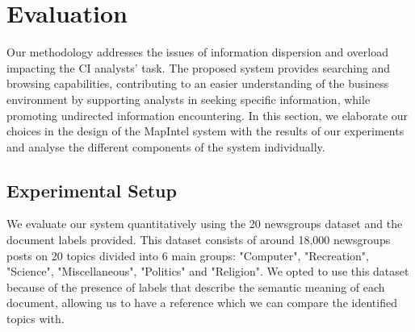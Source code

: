 \documentclass[a4paper]{article}
\begin{document}
\section{Evaluation}
Our methodology addresses the issues of information dispersion and overload impacting the CI analysts' task. The proposed system provides searching and browsing capabilities, contributing to an easier understanding of the business environment by supporting analysts in seeking specific information, while promoting undirected information encountering. In this section, we elaborate our choices in the design of the MapIntel system with the results of our experiments and analyse the different components of the system individually.

\subsection{Experimental Setup}
We evaluate our system quantitatively using the 20 newsgroups \citep{pedregosa2011} dataset and the document labels provided. This dataset consists of around 18,000 newsgroups posts on 20 topics divided into 6 main groups: "Computer", "Recreation", "Science", "Miscellaneous", "Politics" and "Religion". We opted to use this dataset because of the presence of labels that describe the semantic meaning of each document, allowing us to have a reference which we can compare the identified topics with.
\end{document}
